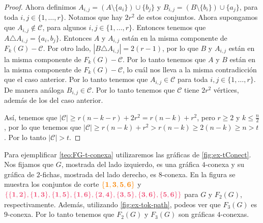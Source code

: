 \begin{proof}
Ahora definimos $A_{i,j} = (A\setminus \{a_i\}) \cup \{b_j\}$ y $B_{i,j} =
(B\setminus \{b_i\}) \cup \{a_j\}$, para toda $ i, j \in \{1, \dots, r\}$.
Notamos que hay $2r^2$ de estos conjuntos. Ahora supongamos que $A_{i,j} \notin
\mathcal{C}$, para algunos $ i, j \in \{1, \dots, r\}$. Entonces tenemos que $A
\triangle A_{i,j} = \{a_i, b_j\}$. Entonces $A$ y $A_{i,j}$ est\'an en la misma
componente de $F_k(G)- \mathcal{C}$. Por otro lado, $|B \triangle A_{i,j}| = 2
(r-1)$, por lo que $B$ y $A_{i,j}$ est\'an en la misma componente de $F_k(G) -
\mathcal{C}$. Por lo tanto tenemos que $A$ y $B$ est\'an en la misma componente
de $F_k(G)-\mathcal{C}$, lo cu\'al nos lleva a la misma contradicci\'on que el
caso anterior. Por lo tanto tenemos que $A_{i,j} \in \mathcal{C}$ para toda $i,
j \in \{1, \dots, r\}$. De manera an\'aloga $B_{i,j} \in \mathcal{C}$. Por lo
tanto tenemos que $\mathcal{C}$ tiene $2r^2$ v\'ertices, adem\'as de los del
caso anterior.

As\'i, tenemos que $|\mathcal{C}|\geq r(n-k-r)+2r^2 = r(n-k) + r^2$, pero $r
\geq 2$ y $k \leq \frac{n}{2}$, por lo que tenemos que $|\mathcal{C}| \geq
r(n-k)+r^2 > r(n-k) \geq 2(n-k) \geq n >t$. Por lo tanto $|\mathcal{C}|>t$.
\end{proof} 

Para ejemplificar \cref{teo:FG-t-conexa} utilizaremos las gr\'aficas de
\cref{fig:ex-tConect}. Nos fijamos que $G$, mostrada del lado izquierdo, es una
gr\'afica $4$-conexa y su gr\'afica de $2$-fichas, mostrada del lado derecho, es
$8$-conexa. En la figura se muestra los conjuntos de corte
${\color{naranja}\bf \{1,3,5,6\}}$ y
${\color{fushia}\bf \{\{1,2\},\{1,3\},\{1,5\},\{1,6\},\{2,4\},\{3,5\},\{3,6\},\{5,6\}\}}$
para $G$ y $F_2(G)$, respectivamente. Adem\'as, utilizando
\cref{fig:ex-tok-path}, podeos ver que $F_3(G)$ es $9$-conexa. Por lo tanto
tenemos que $F_2(G)$ y $F_3(G)$ son gr\'aficas $4$-conexas.

